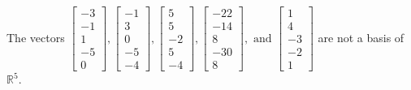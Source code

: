 \begin{exercise}
\begin{exerciseStatement}
  \end{exerciseStatement}
  \begin{exerciseAnswer}
   The vectors \(\left[\begin{array}{r}
-3 \\
-1 \\
1 \\
-5 \\
0
\end{array}\right] , \left[\begin{array}{r}
-1 \\
3 \\
0 \\
-5 \\
-4
\end{array}\right] , \left[\begin{array}{r}
5 \\
5 \\
-2 \\
5 \\
-4
\end{array}\right] , \left[\begin{array}{r}
-22 \\
-14 \\
8 \\
-30 \\
8
\end{array}\right] , \text{ and } \left[\begin{array}{r}
1 \\
4 \\
-3 \\
-2 \\
1
\end{array}\right]\) 
  	 are not  a basis of \(\mathbb{R}^5\).
  


  \end{exerciseAnswer}
\end{exercise}